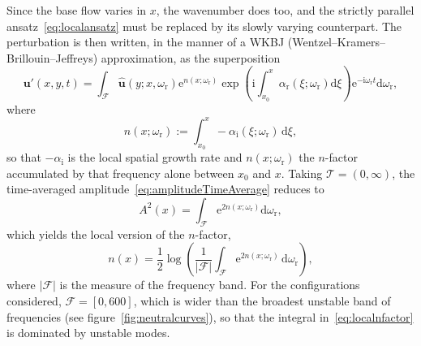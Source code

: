 \documentclass[lineno]{jfm}
\begin{document}
Since the base flow varies in $x$, the wavenumber does too, and the strictly parallel ansatz~\eqref{eq:localansatz} must be replaced by its slowly varying counterpart. The perturbation is then written, in the manner of a WKBJ (Wentzel--Kramers--Brillouin--Jeffreys) approximation, as the superposition
\begin{equation}
	\boldsymbol{u}'(x,y,t)
	=
	\int_{\mathcal{F}}\hat{\boldsymbol{u}}(y;x,\omega_\mathrm{r})
	\mathrm{e}^{n(x;\omega_\mathrm{r})}\exp\left(\mathrm{i}\int_{x_0}^{x}\alpha_\mathrm{r}(\xi;\omega_\mathrm{r})\mathrm{d}\xi\right)
	\mathrm{e}^{-\mathrm{i}\omega_\mathrm{r} t}\mathrm{d}\omega_\mathrm{r},
\end{equation}
where
\begin{equation}
	n(x;\omega_\mathrm{r}) := \int_{x_0}^{x} -\alpha_\mathrm{i}(\xi;\omega_\mathrm{r})\,\mathrm{d}\xi,
\end{equation}
so that $-\alpha_\mathrm{i}$ is the local spatial growth rate and $n(x;\omega_\mathrm{r})$ the $n$-factor accumulated by that frequency alone between $x_0$ and $x$. Taking $\mathcal{T}=(0,\infty)$, the time-averaged amplitude~\eqref{eq:amplitudeTimeAverage} reduces to
\begin{equation}	A^2(x) = \int_{\mathcal{F}} \mathrm{e}^{2 n(x;\omega_\mathrm{r})}\mathrm{d}\omega_\mathrm{r},
\end{equation}
which yields the local version of the $n$-factor,
\begin{equation}\label{eq:localnfactor}
	n(x) = \frac{1}{2}\log\left(\frac{1}{|\mathcal{F}|}\int_{\mathcal{F}} \mathrm{e}^{2 n(x;\omega_\mathrm{r})}\,\mathrm{d}\omega_\mathrm{r}\right),
\end{equation}
where $|\mathcal{F}|$ is the measure of the frequency band. For the configurations considered, $\mathcal{F}=[0,600]$, which is wider than the broadest unstable band of frequencies (see figure~\ref{fig:neutralcurves}), so that the integral in~\eqref{eq:localnfactor} is dominated by unstable modes.
\end{document}
